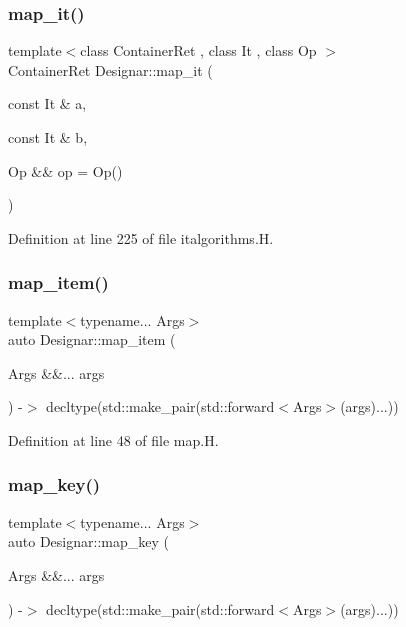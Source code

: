 \mbox{\label{namespace_designar_af22321d9c71f1bfa82df1e71f779dc86}} 
\subsubsection{\texorpdfstring{map\+\_\+it()}{map\_it()}\hspace{0.1cm}{\footnotesize\ttfamily [2/2]}}
{\footnotesize\ttfamily template$<$class Container\+Ret , class It , class Op $>$ \\
Container\+Ret Designar\+::map\+\_\+it (\begin{DoxyParamCaption}\item[{const It \&}]{a,  }\item[{const It \&}]{b,  }\item[{Op \&\&}]{op = {\ttfamily Op()} }\end{DoxyParamCaption})}



Definition at line 225 of file italgorithms.\+H.

\mbox{\label{namespace_designar_a1a0ef2d0cfea5299ec7b7ecf420665f2}} 
\subsubsection{\texorpdfstring{map\+\_\+item()}{map\_item()}}
{\footnotesize\ttfamily template$<$typename... Args$>$ \\
auto Designar\+::map\+\_\+item (\begin{DoxyParamCaption}\item[{Args \&\&...}]{args }\end{DoxyParamCaption}) -\/$>$ decltype(std\+::make\+\_\+pair(std\+::forward$<$Args$>$(args)...))
  }



Definition at line 48 of file map.\+H.

\mbox{\label{namespace_designar_ae056f21d6632882d928c2452439836c9}} 
\subsubsection{\texorpdfstring{map\+\_\+key()}{map\_key()}}
{\footnotesize\ttfamily template$<$typename... Args$>$ \\
auto Designar\+::map\+\_\+key (\begin{DoxyParamCaption}\item[{Args \&\&...}]{args }\end{DoxyParamCaption}) -\/$>$ decltype(std\+::make\+\_\+pair(std\+::forward$<$Args$>$(args)...))
  }




